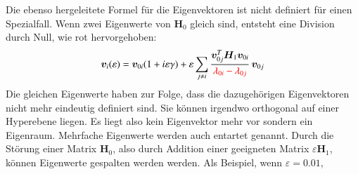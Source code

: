 Die ebenso hergeleitete Formel  für die Eigenvektoren ist nicht definiert für einen Spezialfall.
Wenn zwei Eigenwerte von $\bm H_0$ gleich sind, entsteht eine Division durch Null, wie rot hervorgehoben:
\begin{equation*} %
    \bm v_i(\varepsilon)
    =
    \bm v_{0i} ( 1 + i \varepsilon \gamma ) + \varepsilon \sum_{j \neq i}
    \frac{\bm v_{0j}^T \bm H_1 \bm v_{0i}}{\RD{\lambda_{0i} - \lambda_{0j}}}
    \, \bm v_{0j}
\end{equation*}
Die gleichen Eigenwerte haben zur Folge, dass die dazugehörigen Eigenvektoren nicht mehr eindeutig definiert sind.
Sie können irgendwo orthogonal auf einer Hyperebene liegen.
Es liegt also kein Eigenvektor mehr vor sondern ein Eigenraum.
Mehrfache Eigenwerte werden auch entartet genannt.
Durch die Störung einer Matrix $\bm H_0$, also durch Addition einer geeigneten Matrix $\varepsilon \bm H_1$, können Eigenwerte gespalten werden werden.
Als Beispiel, wenn $\varepsilon = 0.01$,
